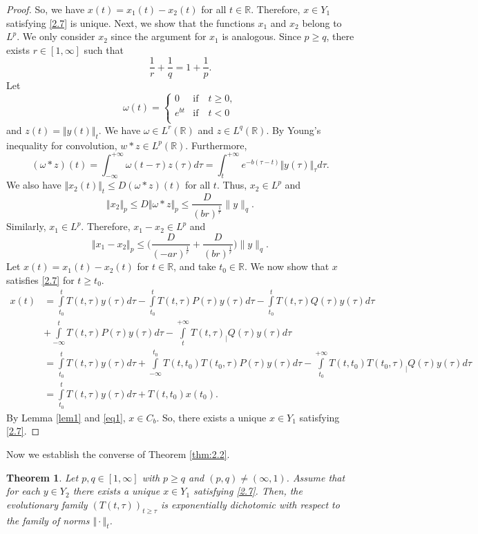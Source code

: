 \documentclass[reqno]{amsart}
\newtheorem{theorem}{Theorem}[section]
\def\r{\mathbb{R}}
\begin{document}
\begin{proof}
So, we have $x(t)=x_1(t)-x_2(t)$ for all $t\in \mathbb{R}$. Therefore, $x\in Y_1$ satisfying \eqref{2.7} is unique.
Next, we show that the functions  $x_1$ and $x_2$ belong to $L^p$.
We only consider $x_2$ since the argument for $x_1$ is analogous. 
Since $p \geq q$, there exists $r \in [1,\infty]$ such that
$$\dfrac{1}{r}+\dfrac{1}{q}=1+\dfrac{1}{p}.$$ 
Let
$$
 \omega (t)=
 \begin{cases}
 0& \text{if}\quad t \geq 0,\\
e^{{b}t}& \text{if}\quad t<0\\ 
 \end{cases}
 $$
 and $z(t)=\Vert y(t)\Vert_t$. We have $\omega \in L^{r}(\r)$ and $z\in L^q(\mathbb{R})$.
By Young's inequality  for convolution,   $w*z \in L^p(\mathbb{R})$. Furthermore,
$$(\omega *z)(t)= \displaystyle \int _{-\infty}^{+\infty}\omega (t-\tau)z(\tau)d\tau=\displaystyle \int _{t}^{+\infty}e^{-{b}(\tau -t)}\Vert y(\tau) \Vert_{\tau}d\tau.$$
We also have $\Vert x_2(t)\Vert _t \le D(\omega *z)(t)$ for all $t$. Thus, $x_2 \in L^p$ and
$$\Vert x_2\Vert_p \leq D \Vert \omega *z\Vert _p \le \frac{D}{(br)^{\frac{1}{r}}} \|y\|_q.$$
Similarly, $x_1 \in L^p$. Therefore, $x_1 - x_2 \in L^p$ and
$$ \Vert x_1 -x_2 \Vert_p \le \Big(\frac{D}{(-ar)^{\frac{1}{r}}}+ \frac{D}{(br)^{\frac{1}{r}}}\Big) \|y\|_q.$$
Let $x(t)=x_1(t)-x_2(t)$ for $t \in \mathbb{R}$, and take $t_0 \in \mathbb{R}$. We now show that $x$ satisfies \eqref{2.7} for $t\ge t_0$. 
\begin{align}
x(t)&=\displaystyle\int\limits_{t_0}^{t}T(t,\tau)y(\tau)d\tau-\displaystyle\int\limits_{t_0}^{t}T(t,\tau)P(\tau)y(\tau)d\tau -\displaystyle\int\limits_{t_0}^{t}T(t,\tau)Q(\tau)y(\tau)d\tau \nonumber
\\&+\displaystyle\int\limits_{-\infty}^{t}T(t,\tau)P(\tau)y(\tau)d\tau-\displaystyle\int\limits_{t}^{+\infty}T(t,\tau)_|Q(\tau)y(\tau)d\tau \nonumber\\
&=\displaystyle\int\limits_{t_0}^{t}T(t,\tau)y(\tau)d\tau+\displaystyle\int\limits_{-\infty}^{t_0}T(t,t_0)T(t_0,\tau)P(\tau)y(\tau)d\tau-\displaystyle\int\limits_{t_0}^{+\infty}T(t,t_0)T(t_0,\tau)_|Q(\tau)y(\tau)d\tau \nonumber\\
&=\displaystyle\int\limits_{t_0}^{t}T(t,\tau)y(\tau)d\tau+T(t,t_0)x(t_0).\nonumber 
\end{align}
By Lemma \ref{lem1} and \eqref{eq1}, $x\in C_b$.
So, there exists a unique $x \in Y_1$ satisfying \eqref{2.7}.
\end{proof}
 Now we establish the converse of Theorem \ref{thm:2.2}.
  \begin{theorem}\label{thm:2.3}
Let $p,q \in [1, \infty]$ with $p \geq q$ and $(p,q)\ne (\infty,1)$. 
  Assume that for each $y \in Y_2$ there exists a unique $x \in Y_1$ satisfying \eqref{2.7}. Then, the evolutionary family $(T(t,\tau))_{t \geq \tau}$ is exponentially dichotomic with respect to the family of norms $\Vert \cdot\Vert _t$.
  \end{theorem}
\end{document}
